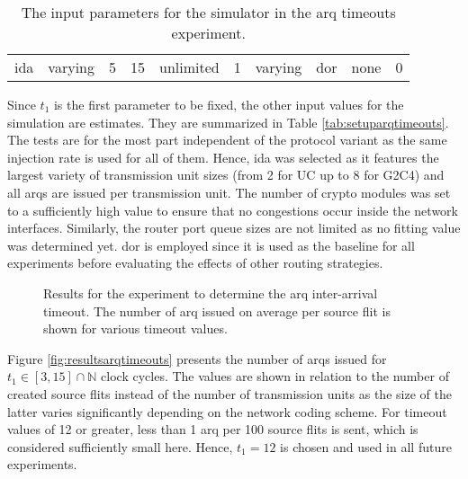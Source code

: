 \begin{table}
    \centering
    \begin{tabulary}{\textwidth}{C|C|C|C|C|C|C|C|C|C}
        \pProtVar{} & \pNCMode{} & \pEncMods{} & \pAuthMods{} & \pRQSize{} & \pARQLimit{} & \pARQTimeout{} & \pRStrat{} & \pAttackerSet{} & \pAttackProb{} \\\hline
        \gls{ida}   & varying    & 5           & 15           & unlimited  & 1            & varying        & \gls{dor}  & none            & 0              \\
    \end{tabulary}
    \caption[Input parameters for the ARQ timeouts experiment]{The input parameters for the simulator in the \gls{arq} timeouts experiment.}
    \label{tab:setuparqtimeouts}
\end{table}

Since $t_1$ is the first parameter to be fixed, the other input values for the simulation are estimates. They are summarized in Table
\vref{tab:setuparqtimeouts}. The tests are for the most part independent of the protocol variant as the same injection rate is used for all of them.
Hence, \gls{ida} was selected as it features the largest variety of transmission unit sizes (from 2 for UC up to 8 for G2C4) and all \glspl{arq} are
issued per transmission unit. The number of crypto modules was set to a sufficiently high value to ensure that no congestions occur inside the network
interfaces. Similarly, the router port queue sizes are not limited as no fitting value was determined yet. \Gls{dor} is employed since it is used as
the baseline for all experiments before evaluating the effects of other routing strategies.

\begin{figure}
    \centering
    
    \caption[Results for the ARQ timeouts experiment]{Results for the experiment to determine the \gls{arq} inter-arrival timeout. The number of \gls{arq}
    issued on average per source flit is shown for various timeout values.}
    \label{fig:resultsarqtimeouts}
\end{figure}

Figure \vref{fig:resultsarqtimeouts} presents the number of \glspl{arq} issued for $t_1 \in [3, 15] \cap \mathbb{N}$ clock cycles. The values are shown in relation to
the number of created source flits instead of the number of transmission units as the size of the latter varies significantly depending on the network
coding scheme. For timeout values of 12 or greater, less than 1 \gls{arq} per 100 source flits is sent, which is considered sufficiently small here.
Hence, $t_1 = 12$ is chosen and used in all future experiments.

